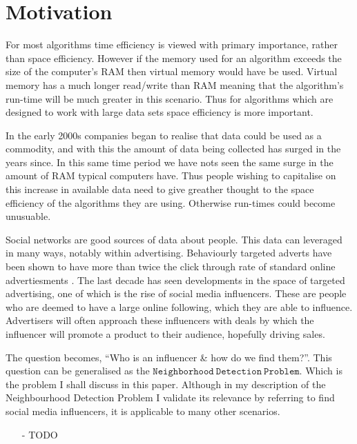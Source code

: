 \documentclass[11pt,twoside,a4paper]{report}
\begin{document}
\section{Motivation}
\par For most algorithms time efficiency is viewed with primary importance, rather than space efficiency. However if the memory used for an algorithm exceeds the size of the computer's RAM then virtual memory would have be used. Virtual memory has a much longer read/write than RAM meaning that the algorithm's run-time will be much greater in this scenario. Thus for algorithms which are designed to work with large data sets space efficiency is more important.
\par In the early 2000s companies began to realise that data could be used as a commodity, and with this the amount of data being collected has surged in the years since. In this same time period we have nots seen the same surge in the amount of RAM typical computers have. Thus people wishing to capitalise on this increase in available data need to give greather thought to the space efficiency of the algorithms they are using. Otherwise run-times could become unusuable.
\par Social networks are good sources of data about people. This data can leveraged in many ways, notably within advertising. Behaviourly targeted adverts have been shown to have more than twice the click through rate of standard online advertiesments \cite{targetedAds}. The last decade has seen developments in the space of targeted advertising, one of which is the rise of social media influencers. These are people who are deemed to have a large online following, which they are able to influence. Advertisers will often approach these influencers with deals by which the influencer will promote a product to their audience, hopefully driving sales.
\par The question becomes, ``Who is an influencer \& how do we find them?''. This question can be generalised as the $\mathtt{Neighborhood\ Detection\ Problem}$. Which is the problem I shall discuss in this paper.
Although in my description of the Neighbourhood Detection Problem I validate its relevance by referring to find social media influencers, it is applicable to many other scenarios.
\begin{itemize}
	\item[-] TODO
\end{itemize}
\end{document}
